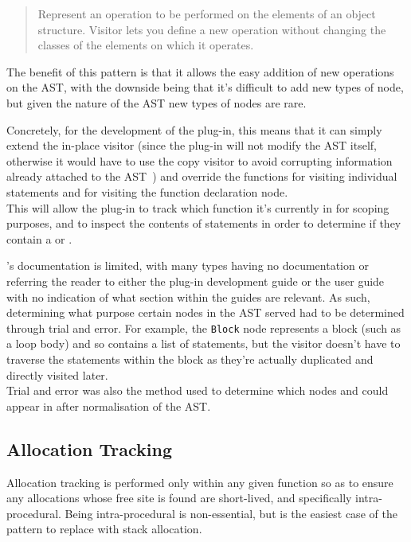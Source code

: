 \begin{quote}
	Represent an operation to be performed on the elements of an object structure. Visitor lets you define a new operation without changing the classes of the elements on which it operates.~\cite{gof}
\end{quote}

The benefit of this pattern is that it allows the easy addition of new operations on the AST, with the downside being that it's difficult to add new types of node, but given the nature of the AST new types of nodes are rare.

Concretely, for the development of the plug-in, this means that it can simply extend the in-place visitor (since the plug-in will not modify the AST itself, otherwise it would have to use the copy visitor to avoid corrupting information already attached to the AST~\cite{framaplug}) and override the functions for visiting individual statements and for visiting the function declaration node. \\
This will allow the plug-in to track which function it's currently in for scoping purposes, and to inspect the contents of statements in order to determine if they contain a \malloc{} or \free{}.

's documentation is limited, with many types having no documentation or referring the reader to either the plug-in development guide or the user guide with no indication of what section within the guides are relevant. As such, determining what purpose certain nodes in the AST served had to be determined through trial and error. For example, the \texttt{Block} node represents a block (such as a loop body) and so contains a list of statements, but the visitor doesn't have to traverse the statements within the block as they're actually duplicated and directly visited later.\\
Trial and error was also the method used to determine which nodes \malloc{} and \free{} could appear in after normalisation of the AST\@.

\subsection{Allocation Tracking}\label{alloctrack}

Allocation tracking is performed only within any given function so as to ensure any allocations whose free site is found are short-lived, and specifically intra-procedural. Being intra-procedural is non-essential, but is the easiest case of the pattern to replace with stack allocation.

